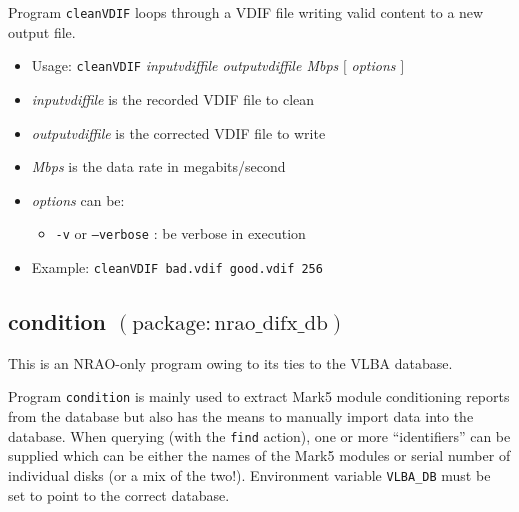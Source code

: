 Program {\tt cleanVDIF} loops through a VDIF file writing valid content to a new output file.

\begin{itemize}
\item[] Usage: {\tt cleanVDIF} {\em inputvdiffile outputvdiffile Mbps} $[$ {\em options} $]$ 

\item[] {\em inputvdiffile} is the recorded VDIF file to clean
\item[] {\em outputvdiffile} is the corrected VDIF file to write
\item[] {\em Mbps} is the data rate in megabits/second
\item[] {\em options} can be:
\begin{itemize}
\item[] {\tt -v} or {\tt --verbose} : be verbose in execution
\end{itemize}

\item[] Example: {\tt cleanVDIF bad.vdif good.vdif 256}
\end{itemize}





\subsection{condition {\small $\mathrm{(package: nrao\_difx\_db)}$}}

This is an NRAO-only program owing to its ties to the VLBA database.

Program {\tt condition} is mainly used to extract Mark5 module conditioning reports from the database but also has the means to manually import data into the database.
When querying (with the {\tt find} action), one or more ``identifiers'' can be supplied which can be either the names of the Mark5 modules or serial number of individual disks (or a mix of the two!).
Environment variable {\tt VLBA\_DB} must be set to point to the correct database.

